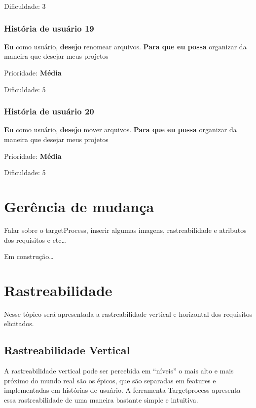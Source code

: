     Dificuldade: 3

  \subsubsection{História de usuário 19}
    \textbf{Eu} como usuário, \textbf{desejo} renomear arquivos. \textbf{Para que eu possa} organizar da maneira que desejar meus projetos

    Prioridade: \textbf{Média}

    Dificuldade: 5

  \subsubsection{História de usuário 20}
    \textbf{Eu} como usuário, \textbf{desejo} mover arquivos. \textbf{Para que eu possa} organizar da maneira que desejar meus projetos

    Prioridade: \textbf{Média}

    Dificuldade: 5



\section{Gerência de mudança}

  Falar sobre o targetProcess, inserir algumas imagens, rastreabilidade e atributos dos requisitos e etc\ldots

  Em construção\ldots

\section{Rastreabilidade}

  Nesse tópico será apresentada a rastreabilidade vertical e horizontal dos requisitos elicitados.

\subsection{Rastreabilidade Vertical}

A rastreabilidade vertical pode ser percebida em “níveis” o mais alto e mais próximo do mundo real são os épicos, que são separadas em features e implementadas em histórias de usuário. A ferramenta Targetprocess apresenta essa rastreabilidade de uma maneira bastante simple e intuitiva. 

